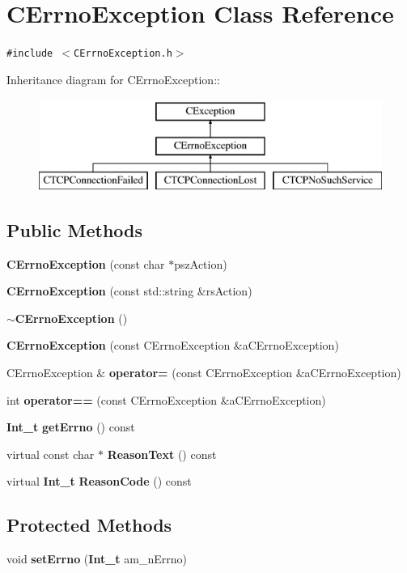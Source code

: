 \section{CErrno\-Exception  Class Reference}
\label{classCErrnoException}
{\tt \#include $<$CErrno\-Exception.h$>$}

Inheritance diagram for CErrno\-Exception::\begin{figure}[H]
\begin{center}
\leavevmode
\includegraphics[height=3cm]{classCErrnoException}
\end{center}
\end{figure}
\subsection*{Public Methods}
\begin{CompactItemize}
\item 
{\bf CErrno\-Exception} (const char $\ast$psz\-Action)
\item 
{\bf CErrno\-Exception} (const std::string \&rs\-Action)
\item 
{\bf $\sim$CErrno\-Exception} ()
\item 
{\bf CErrno\-Exception} (const CErrno\-Exception \&a\-CErrno\-Exception)
\item 
CErrno\-Exception \& {\bf operator=} (const CErrno\-Exception \&a\-CErrno\-Exception)
\item 
int {\bf operator==} (const CErrno\-Exception \&a\-CErrno\-Exception)
\item 
{\bf Int\_\-t} {\bf get\-Errno} () const
\item 
virtual const char $\ast$ {\bf Reason\-Text} () const
\item 
virtual {\bf Int\_\-t} {\bf Reason\-Code} () const
\end{CompactItemize}
\subsection*{Protected Methods}
\begin{CompactItemize}
\item 
void {\bf set\-Errno} ({\bf Int\_\-t} am\_\-n\-Errno)
\end{CompactItemize}
